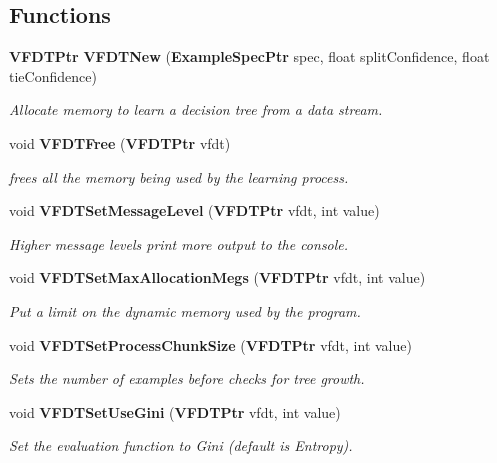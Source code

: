 \subsection*{Functions}
\begin{CompactItemize}
\item 
{\bf VFDTPtr} {\bf VFDTNew} ({\bf Example\-Spec\-Ptr} spec, float split\-Confidence, float tie\-Confidence)
\begin{CompactList}\small\item\em Allocate memory to learn a decision tree from a data stream. \item\end{CompactList}\item 
void {\bf VFDTFree} ({\bf VFDTPtr} vfdt)
\begin{CompactList}\small\item\em frees all the memory being used by the learning process. \item\end{CompactList}\item 
void {\bf VFDTSet\-Message\-Level} ({\bf VFDTPtr} vfdt, int value)
\begin{CompactList}\small\item\em Higher message levels print more output to the console. \item\end{CompactList}\item 
void {\bf VFDTSet\-Max\-Allocation\-Megs} ({\bf VFDTPtr} vfdt, int value)
\begin{CompactList}\small\item\em Put a limit on the dynamic memory used by the program. \item\end{CompactList}\item 
void {\bf VFDTSet\-Process\-Chunk\-Size} ({\bf VFDTPtr} vfdt, int value)
\begin{CompactList}\small\item\em Sets the number of examples before checks for tree growth. \item\end{CompactList}\item 
void {\bf VFDTSet\-Use\-Gini} ({\bf VFDTPtr} vfdt, int value)
\begin{CompactList}\small\item\em Set the evaluation function to Gini (default is Entropy). \item\end{CompactList}\item 

\end{CompactItemize}
